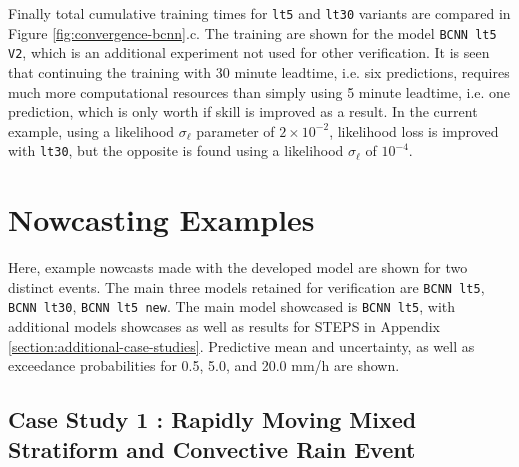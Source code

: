 Finally total cumulative training times for \texttt{lt5} and \texttt{lt30} variants are compared in Figure \ref{fig:convergence-bcnn}.c. The training are shown for the model \texttt{BCNN lt5 V2}, which is an additional experiment not used for other verification. It is seen that continuing the training with 30 minute leadtime, i.e. six predictions, requires much more computational resources than simply using 5 minute leadtime, i.e. one prediction, which is only worth if skill is improved as a result. In the current example, using a likelihood $\sigma_\ell$ parameter of $2 \times 10^{-2}$, likelihood loss is improved with \texttt{lt30}, but the opposite is found using a likelihood $\sigma_\ell$ of $10^{-4}$.

\section{Nowcasting Examples}

Here, example nowcasts made with the developed model are shown for two distinct events. The main three models retained for verification are \texttt{BCNN lt5}, \texttt{BCNN lt30}, \texttt{BCNN lt5 new}. The main model showcased is \texttt{BCNN lt5}, with additional models showcases as well as results for STEPS in Appendix \ref{section:additional-case-studies}.  Predictive mean and uncertainty, as well as exceedance probabilities for 0.5, 5.0, and 20.0 mm/h are shown.  

\subsection{Case Study 1 : Rapidly Moving Mixed Stratiform and Convective Rain Event}

